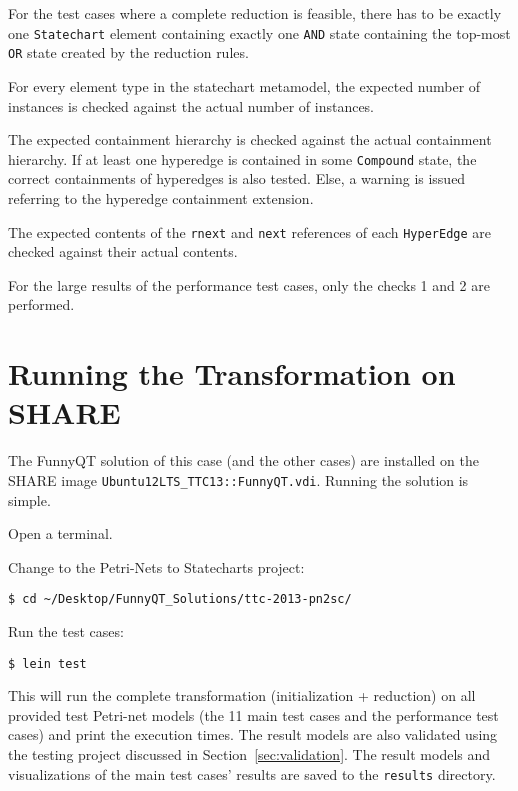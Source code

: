 \documentclass[11pt]{article}
\begin{document}
\begin{compactenum}
\item For the test cases where a complete reduction is feasible, there has to
  be exactly one \verb|Statechart| element containing exactly one \verb|AND|
  state containing the top-most \verb|OR| state created by the reduction rules.
\item For every element type in the statechart metamodel, the expected number
  of instances is checked against the actual number of instances.
\item The expected containment hierarchy is checked against the actual
  containment hierarchy.  If at least one hyperedge is contained in some
  \verb|Compound| state, the correct containments of hyperedges is also tested.
  Else, a warning is issued referring to the hyperedge containment extension.
\item The expected contents of the \verb|rnext| and \verb|next| references of
  each \verb|HyperEdge| are checked against their actual contents.
\end{compactenum}

For the large results of the performance test cases, only the checks 1 and 2
are performed.


\section{Running the Transformation on SHARE}
\label{sec:run-transformation}

The FunnyQT solution of this case (and the other cases) are
installed on the SHARE image \verb|Ubuntu12LTS_TTC13::FunnyQT.vdi|.  Running
the solution is simple.

\begin{compactenum}
\item Open a terminal.
\item Change to the Petri-Nets to Statecharts project:

  \verb|$ cd ~/Desktop/FunnyQT_Solutions/ttc-2013-pn2sc/|
\item Run the test cases:

  \verb|$ lein test|
\end{compactenum}

This will run the complete transformation (initialization + reduction) on all
provided test Petri-net models (the 11 main test cases and the performance test
cases) and print the execution times.  The result models are also validated
using the testing project discussed in Section~\ref{sec:validation}.  The
result models and visualizations of the main test cases' results are saved to
the \verb|results| directory.
\end{document}
